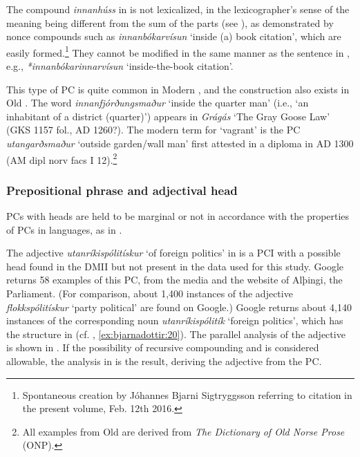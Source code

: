 \documentclass[output=paper]{LSP/langsci}
\begin{document}
\begin{xlist}
The compound \textit{innanhúss} in  is not lexicalized, in the lexicographer’s sense of the meaning being different from the sum of the parts (see \citealt[42]{Svensén1993}), as demonstrated by nonce compounds such as \textit{innanbókarvísun} ‘inside (a) book citation’, which are easily formed.{}\footnote{Spontaneous creation by Jóhannes Bjarni Sigtryggsson referring to citation in the present volume, Feb. 12th 2016.}  They cannot be modified in the same manner as the sentence in ,  e.g., \textit{*innanbókarinnarvísun} ‘inside-the-book citation’.

This type of PC is quite common in Modern , and the construction also exists in Old . The word \textit{innanfjórðungsmaður} ‘inside the quarter man’ (i.e., ‘an inhabitant of a district (quarter)’) appears in \textit{Grágás} ‘The Gray Goose Law’ (GKS 1157 fol., AD 1260?). The modern term for ‘vagrant’ is the PC \textit{utangarðsmaður} ‘outside garden/wall man’ first attested in a  diploma in AD 1300 (AM dipl norv facs I 12).\footnote{All examples from Old  are derived from \textit{The Dictionary of Old Norse Prose} (ONP).}

\subsubsection{Prepositional phrase and adjectival head}\label{sec:bjarnadottir:3.1.5}

PCs with  heads are held to be marginal \citep[237]{Meibauer2007} or not in accordance with the properties of PCs in  languages, as in \citet[153]{Trips2016}. 

The adjective \textit{utanríkispólitískur} ‘of foreign politics’ in  is a PCI with a possible  head found in the DMII but not present in the data used for this study. Google returns 58 examples of this PC, from the media and the website of Alþingi, the  Parliament. (For comparison, about 1,400 instances of the adjective \textit{flokkspólitískur} ‘party political’ are found on Google.) Google returns about 4,140 instances of the corresponding noun \textit{utanríkispólitík} ‘foreign politics’, which has the structure in  (cf. , \ref{ex:bjarnadottir:20}). The parallel analysis of the adjective is shown in . If the possibility of recursive compounding and  is considered allowable, the analysis in  is the result, deriving the adjective from the PC. 


\end{xlist}
\end{document}
